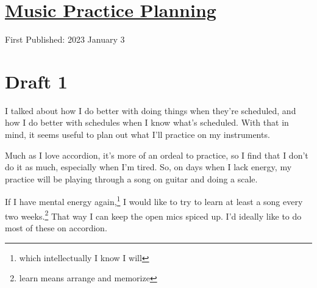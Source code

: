 \documentclass[12pt]{article}[titlepage]
\newcommand{\1}{\={a}}
\newcommand{\2}{\={e}}
\newcommand{\3}{\={\i}}
\newcommand{\4}{\=o}
\newcommand{\5}{\=u}
\newcommand{\6}{\={A}}
\renewcommand{\,}{\textsuperscript{,}}
\begin{document}
\doublespacing
\section{\href{music-planning.html}{Music Practice Planning}}
First Published: 2023 January 3

\section{Draft 1}
I talked about how I do better with doing things when they're scheduled, and how I do better with schedules when I know what's scheduled.
With that in mind, it seems useful to plan out what I'll practice on my instruments.

Much as I love accordion, it's more of an ordeal to practice, so I find that I don't do it as much, especially when I'm tired.
So, on days when I lack energy, my practice will be playing through a song on guitar and doing a scale.

If I have mental energy again,\footnote{which intellectually I know I will} I would like to try to learn at least a song every two weeks.\footnote{learn means arrange and memorize}
That way I can keep the open mics spiced up.
I'd ideally like to do most of these on accordion.
\end{document}
